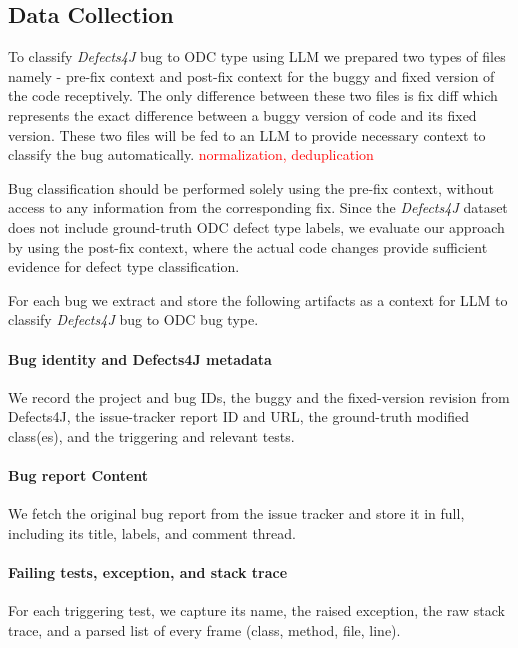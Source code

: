 \subsection{Data Collection}
\label{subsec:collection}
To classify \textit{Defects4J} bug to ODC type using LLM we prepared two types of files namely - pre-fix context and post-fix context for the buggy and fixed version of the code receptively. The only difference between these two files is fix diff which represents the exact difference between a buggy version of code and its fixed version. These two files will be fed to an LLM to provide necessary context to classify the bug automatically. \textcolor{red}{normalization, deduplication}

Bug classification should be performed solely using the pre-fix context, without access to any information from the corresponding fix. Since the \textit{Defects4J} dataset does not include ground-truth ODC defect type labels, we evaluate our approach by using the post-fix context, where the actual code changes provide sufficient evidence for defect type classification.

For each bug we extract and store the following artifacts as a context for LLM to classify \textit{Defects4J} bug to ODC bug type.  

\paragraph{Bug identity and Defects4J metadata}
We record the project and bug IDs, the buggy and the
fixed-version revision from Defects4J, the issue-tracker report ID and URL,
the ground-truth modified class(es), and the triggering and relevant tests.

\paragraph{Bug report Content}
We fetch the original bug report from the issue tracker and store it in
full, including its title, labels, and comment thread.


\paragraph{Failing tests, exception, and stack trace}
For each triggering test, we capture its name, the raised exception, the raw
stack trace, and a parsed list of every frame (class, method, file, line).

